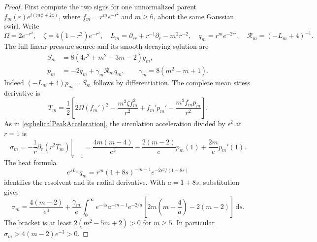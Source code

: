 \documentclass[11pt]{article}
\theoremstyle{remark}
\newcommand{\dd}{\,\mathrm d}
\begin{document}
\begin{proof}
First compute the two signs for one unnormalized parent
$f_m(r)e^{i(m\phi+2z)}$, where $f_m=r^me^{-r^2}$ and $m\geq6$,
about the same Gaussian swirl. Write
\[
 \Omega=2e^{-r^2},\quad \zeta=4(1-r^2)e^{-r^2},\quad
 L_m=\partial_{rr}+r^{-1}\partial_r-m^2r^{-2},\quad
 q_m=r^me^{-2r^2},\quad \mathcal R_m=(-L_m+4)^{-1}.
\]
The full linear-pressure source and its smooth decaying solution are
\begin{align*}
 S_m&=8(4r^2+m^2-3m-2)q_m,\\
 p_m&=-2q_m+\gamma_m\mathcal R_mq_m,
              \qquad \gamma_m=8(m^2-m+1).
\end{align*}
Indeed $(-L_m+4)p_m=S_m$ follows by differentiation.
The complete mean stress derivative is
\[
 T_m=\frac12\left[2\Omega(f_m')^2
       -\frac{m^2\zeta f_m^2}{r^2}+f_m'p_m'
       -\frac{m^2f_mp_m}{r^2}\right].
\]
As in \eqref{eq:helicalPeakAcceleration}, the circulation acceleration
divided by $\epsilon^2$ at $r=1$ is
\[
 \sigma_m=-\left.\frac1r\partial_r(r^2T_m)\right|_{r=1}
  =\frac{4m(m-4)}{e^3}-\frac{2(m-2)}e p_m(1)
                                      +\frac{2m}e p_m'(1).
\]
The heat formula
\[
 e^{sL_m}q_m=r^m(1+8s)^{-m-1}e^{-2r^2/(1+8s)}
\]
identifies the resolvent and its radial derivative. With $a=1+8s$,
substitution gives
\[
 \sigma_m=\frac{4(m-2)}{e^3}
 +\frac{\gamma_m}e\int_0^\infty e^{-4s}a^{-m-1}e^{-2/a}
           \left[2m\left(m-\frac4a\right)-2(m-2)\right]\dd s.
\]
The bracket is at least $2(m^2-5m+2)>0$ for $m\geq5$.
In particular $\sigma_m>4(m-2)e^{-3}>0$.


\end{proof}
\end{document}

